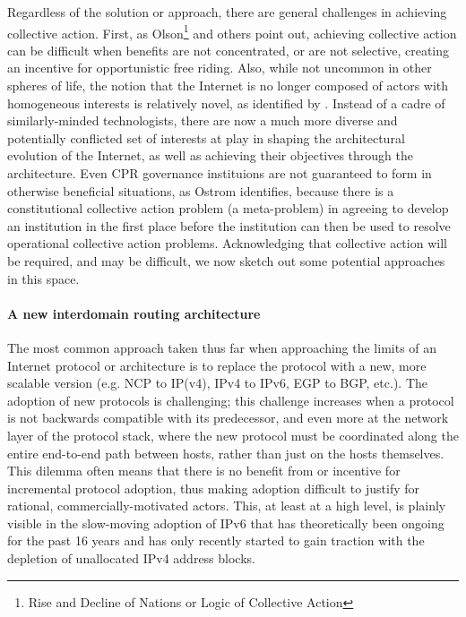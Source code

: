 Regardless of the solution or approach, there are general challenges in
achieving collective action. First, as Olson\footnote{Rise and Decline of
Nations or Logic of Collective Action} and others point out, achieving
collective action can be difficult when benefits are not concentrated, or are
not selective, creating an incentive for opportunistic free riding. Also, while
not uncommon in other spheres of life, the notion that the Internet is no
longer composed of actors with homogeneous interests is relatively novel, as
identified by \cite{Clark:2005rt}. Instead of a cadre of similarly-minded
technologists, there are now a much more diverse and potentially conflicted set
of interests at play in shaping the architectural evolution of the Internet, as
well as achieving their objectives through the architecture. Even CPR
governance instituions are not guaranteed to form in otherwise beneficial
situations, as Ostrom \cite{Ostrom:1990fv} identifies, because there is a
constitutional collective action problem (a meta-problem) in agreeing to
develop an institution in the first place before the institution can then be
used to resolve operational collective action problems. Acknowledging that
collective action will be required, and may be difficult, we now sketch out
some potential approaches in this space.

\paragraph{A new interdomain routing architecture}

The most common approach taken thus far when approaching the limits of an
Internet protocol or architecture is to replace the protocol with a new, more
scalable version (e.g.  NCP to IP(v4), IPv4 to IPv6, EGP to BGP, etc.). The
adoption of new protocols is challenging; this challenge increases when a
protocol is not backwards compatible with its predecessor, and even more at the
network layer of the protocol stack, where the new protocol must be coordinated
along the entire end-to-end path between hosts, rather than just on the hosts
themselves. This dilemma often means that there is no benefit from or incentive
for incremental protocol adoption, thus making adoption difficult to justify
for rational, commercially-motivated actors. This, at least at a high
level, is plainly visible in the slow-moving adoption of IPv6 that has
theoretically been ongoing for the past 16 years \cite{rfc1883} and has only
recently started to gain traction with the depletion of unallocated IPv4
address blocks.

